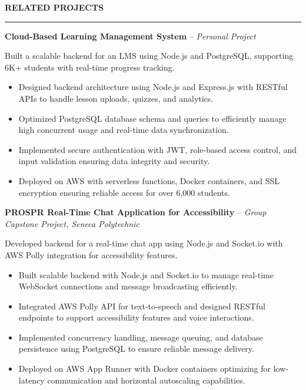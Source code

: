 \documentclass[10pt,letterpaper]{article}
\begin{document}
\vspace{6pt}

\textbf{RELATED PROJECTS}\\[-8pt]
\noindent\rule{\textwidth}{1pt}

\vspace{-2pt}

\textbf{Cloud-Based Learning Management System} -- \emph{Personal Project}

\vspace{-1pt}

Built a scalable backend for an LMS using Node.js and PostgreSQL, supporting 6K+ students with real-time progress tracking.
\vspace{-1pt}
\begin{itemize}
\item Designed backend architecture using Node.js and Express.js with RESTful APIs to handle lesson uploads, quizzes, and analytics.
\item Optimized PostgreSQL database schema and queries to efficiently manage high concurrent usage and real-time data synchronization.
\item Implemented secure authentication with JWT, role-based access control, and input validation ensuring data integrity and security.
\item Deployed on AWS with serverless functions, Docker containers, and SSL encryption ensuring reliable access for over 6,000 students.
\end{itemize}

\textbf{PROSPR  Real-Time Chat Application for Accessibility} -- \emph{Group Capstone Project, Seneca Polytechnic}

\vspace{-1pt}

Developed backend for a real-time chat app using Node.js and Socket.io with AWS Polly integration for accessibility features.
\vspace{-1pt}
\begin{itemize}
\item Built scalable backend with Node.js and Socket.io to manage real-time WebSocket connections and message broadcasting efficiently.
\item Integrated AWS Polly API for text-to-speech and designed RESTful endpoints to support accessibility features and voice interactions.
\item Implemented concurrency handling, message queuing, and database persistence using PostgreSQL to ensure reliable message delivery.
\item Deployed on AWS App Runner with Docker containers optimizing for low-latency communication and horizontal autoscaling capabilities.
\end{itemize}
\end{document}
